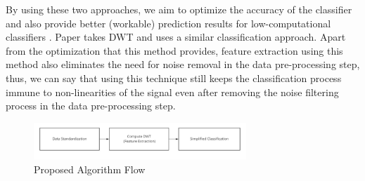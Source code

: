 \documentclass[10pt,twocolumn,letterpaper]{article}
\begin{document}
By using these two approaches, we aim to optimize the accuracy of the classifier and also provide better (workable) prediction results for low-computational classifiers \cite{Alpher02}. Paper \cite{Alpher03}  takes DWT and uses a similar classification approach. Apart from the optimization that this method provides, feature extraction using this method also eliminates the need for noise removal in the data pre-processing step, thus, we can say that using this technique still keeps the classification process immune to non-linearities of the signal even after removing the noise filtering process in the data pre-processing step.
\begin{figure}[htbp]
\includegraphics[width=8cm]{proposed.png}
\caption{Proposed Algorithm Flow}
\label{Proposed Algorithm}
\end{figure}
\end{document}
